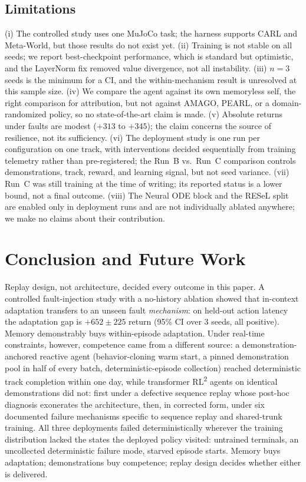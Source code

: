 \documentclass[conference]{IEEEtran}
\newcommand{\rltwo}{RL\textsuperscript{2}}
\begin{document}
\subsection{Limitations}

\label{sec:limitations}

(i) The controlled study uses one MuJoCo task; the harness supports CARL and Meta-World, but those results do not exist yet. (ii) Training is not stable on all seeds; we report best-checkpoint performance, which is standard but optimistic, and the LayerNorm fix removed value divergence, not all instability. (iii) $n{=}3$ seeds is the minimum for a CI, and the within-mechanism result is unresolved at this sample size. (iv) We compare the agent against its own memoryless self, the right comparison for attribution, but not against AMAGO, PEARL, or a domain-randomized policy, so no state-of-the-art claim is made. (v) Absolute returns under faults are modest ($+313$ to $+345$); the claim concerns the source of resilience, not its sufficiency. (vi) The deployment study is one run per configuration on one track, with interventions decided sequentially from training telemetry rather than pre-registered; the Run~B vs.\ Run~C comparison controls demonstrations, track, reward, and learning signal, but not seed variance. (vii) Run~C was still training at the time of writing; its reported status is a lower bound, not a final outcome. (viii) The Neural ODE block and the RESeL split are enabled only in deployment runs and are not individually ablated anywhere; we make no claims about their contribution.



\section{Conclusion and Future Work}

\label{sec:conclusion}

Replay design, not architecture, decided every outcome in this paper. A controlled fault-injection study with a no-history ablation showed that in-context adaptation transfers to an unseen fault \emph{mechanism}: on held-out action latency the adaptation gap is $+652 \pm 225$ return (95\% CI over 3 seeds, all positive). Memory demonstrably buys within-episode adaptation. Under real-time constraints, however, competence came from a different source: a demonstration-anchored reactive agent (behavior-cloning warm start, a pinned demonstration pool in half of every batch, deterministic-episode collection) reached deterministic track completion within one day, while transformer \rltwo{} agents on identical demonstrations did not: first under a defective sequence replay whose post-hoc diagnosis exonerates the architecture, then, in corrected form, under six documented failure mechanisms specific to sequence replay and shared-trunk training. All three deployments failed deterministically wherever the training distribution lacked the states the deployed policy visited: untrained terminals, an uncollected deterministic failure mode, starved episode starts. Memory buys adaptation; demonstrations buy competence; replay design decides whether either is delivered.
\end{document}
